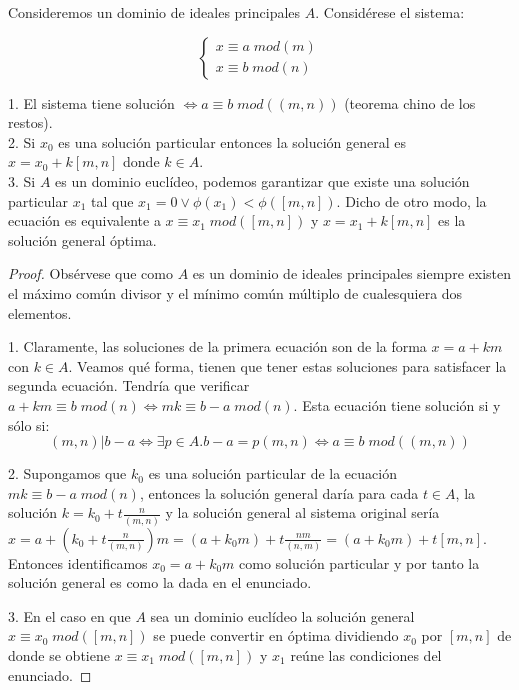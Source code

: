 \begin{theorem}
Consideremos un dominio de ideales principales $A$. Considérese el sistema: 

\[   
\begin{cases}
x \equiv a \; mod(m) \\
x \equiv b \; mod(n) 
\end{cases}
\]

1. El sistema tiene solución $\iff a \equiv b \; mod((m,n))$ (teorema chino de los restos). \\
2. Si $x_0$ es una solución particular entonces la solución general es $x = x_0 +k[m,n]$ donde $k \in A$.\\
3. Si $A$ es un dominio euclídeo, podemos garantizar que existe una solución particular $x_1$ tal que $x_1 = 0 \lor \phi(x_1) < \phi([m,n])$. Dicho de otro modo, la ecuación es equivalente a $x \equiv x_1 \; mod([m,n])$ y $x = x_1 + k [m,n]$ es la solución general óptima. 
\end{theorem}
\begin{proof}
Obsérvese que como $A$ es un dominio de ideales principales siempre existen el máximo común divisor y el mínimo común múltiplo de cualesquiera dos elementos. 

1. Claramente, las soluciones de la primera ecuación son de la forma $x = a +km$ con $k \in A$. Veamos qué forma, tienen que tener estas soluciones para satisfacer la segunda ecuación. Tendría que verificar $a+km \equiv b \; mod(n) \iff mk \equiv b-a \; mod(n)$. Esta ecuación tiene solución si y sólo si: $$(m,n)|b-a \iff \exists p \in A. b-a = p(m,n) \iff a \equiv b \; mod((m,n))$$

2. Supongamos que $k_0$ es una solución particular de la ecuación $mk \equiv b-a \; mod(n)$, entonces la solución general daría para cada $t \in A$, la solución $k = k_0 + t \frac{n}{(m,n)}$ y la solución general al sistema original sería $x = a + (k_0 + t \frac{n}{(m,n)})m = (a+k_0m)+ t \frac{nm}{(n,m)} = (a+k_0m)+t[m,n]$. Entonces identificamos $x_0 = a+k_0m$ como solución particular y por tanto la solución general es como la dada en el enunciado. 

3. En el caso en que $A$ sea un dominio euclídeo la solución general $x \equiv x_0 \; mod([m,n])$ se puede convertir en óptima dividiendo $x_0$ por $[m,n]$ de donde se obtiene $x \equiv x_1 \; mod([m,n])$ y $x_1$ reúne las condiciones del enunciado. 
\end{proof}

